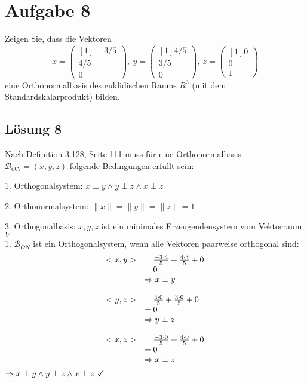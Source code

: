 \documentclass[main.tex]{subfiles}
\begin{document}
\section{Aufgabe 8}
Zeigen Sie, dass die Vektoren
\begin{equation*}
x=\begin{pmatrix}[1]
-3/5\\
4/5\\
0
\end{pmatrix} ,\ y=\begin{pmatrix}[1]
4/5\\
3/5\\
0
\end{pmatrix} ,\ z=\begin{pmatrix}[1]
0\\
0\\
1
\end{pmatrix}
\end{equation*}
eine Orthonormalbasis des euklidischen Raums $R^{3}$ (mit dem Standardskalarprodukt) bilden.

\subsection{Lösung 8}
Nach Definition 3.128, Seite 111 muss für eine Orthonormalbasis $\mathcal{B}_{ON} =( x,y,z)$ folgende Bedingungen erfüllt sein:

1. Orthogonalsystem: $x\perp y\land y\perp z\land x\perp z$

2. Orthonormalsystem: $\| x\| =\| y\| =\| z\| =1$

3. Orthogonalbasis: $x,y,z$ ist ein minimales Erzeugendensystem vom Vektorraum $V$\\


1. $\mathcal{B}_{ON}$ ist ein Orthogonalsystem, wenn alle Vektoren paarweise orthogonal sind:
\begin{equation*}
    \begin{array}{ c l }
        <x,y>  & =\frac{-3\cdotp 4}{5} +\frac{4\cdotp 3}{5} +0\\
        & =0\\
        & \Rightarrow x\perp y\\
        & \\
        <y,z>  & =\frac{4\cdotp 0}{5} +\frac{3\cdotp 0}{5} +0\\
        & =0\\
        & \Rightarrow y\perp z\\
        & \\
        <x,z>  & =\frac{-3\cdotp 0}{5} +\frac{4\cdotp 0}{5} +0\\
        & =0\\
        & \Rightarrow x\perp z
    \end{array}
\end{equation*}
$\Rightarrow x\perp y\land y\perp z\land x\perp z\ \checked $\\
\end{document}
